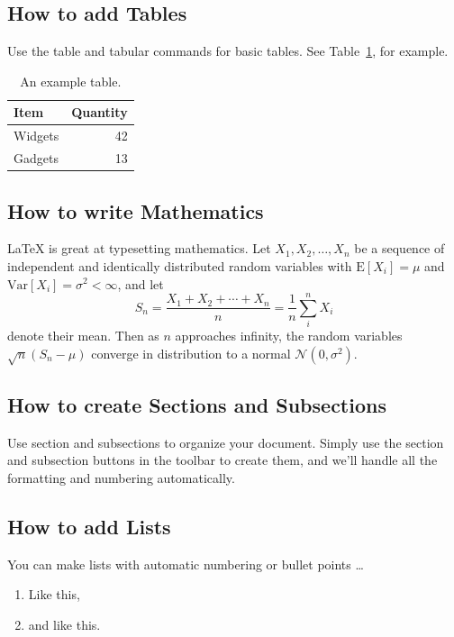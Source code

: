 \documentclass[a4paper]{article}
\begin{document}
\subsection{How to add Tables}

Use the table and tabular commands for basic tables. See Table~\ref{tab:widgets}, for example. 

\begin{table}[h]
\centering
\begin{tabular}{l|r}
Item & Quantity \\\hline
Widgets & 42 \\
Gadgets & 13
\end{tabular}
\caption{\label{tab:widgets}An example table.}
\end{table}

\subsection{How to write Mathematics}

\LaTeX{} is great at typesetting mathematics. Let $X_1, X_2, \ldots, X_n$ be a sequence of independent and identically distributed random variables with $\text{E}[X_i] = \mu$ and $\text{Var}[X_i] = \sigma^2 < \infty$, and let
\[S_n = \frac{X_1 + X_2 + \cdots + X_n}{n}
      = \frac{1}{n}\sum_{i}^{n} X_i\]
denote their mean. Then as $n$ approaches infinity, the random variables $\sqrt{n}(S_n - \mu)$ converge in distribution to a normal $\mathcal{N}(0, \sigma^2)$.


\subsection{How to create Sections and Subsections}

Use section and subsections to organize your document. Simply use the section and subsection buttons in the toolbar to create them, and we'll handle all the formatting and numbering automatically.

\subsection{How to add Lists}

You can make lists with automatic numbering  or bullet points \dots

\begin{enumerate}
\item Like this,
\item and like this.
\end{enumerate}
\end{document}

